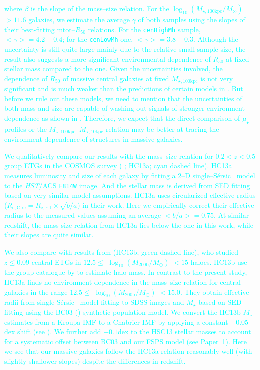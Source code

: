 \documentclass[a4paper,fleqn,usenatbib]{mnras}
\def\ser{{S\'{e}rsic\ }}
\def\rbcg{\texttt{cenHighMh}}
\def\nbcg{\texttt{cenLowMh}}
\def\mstar{{$M_{\star}$}}
\def\logmh{{$\log_{10} (M_{\mathrm{200b}}/M_{\odot})$}}
\def\minn{{$M_{\star,10\mathrm{kpc}}$}}
\def\mtot{{$M_{\star,100\mathrm{kpc}}$}}
\def\logmtot{{$\log_{10} (M_{\star,100\mathrm{kpc}}/M_{\odot})$}}
\def\mden{{$\mu_{\star}$}}
\newcommand{\song}[1]{\textcolor{cyan}{#1}}
\begin{document}
    \song{
    where $\beta$ is the slope of the mass--size relation.
    For the \logmtot{}$>11.6$ galaxies, we estimate the average $\gamma$ of both
    samples using the slopes of their best-fitting mtot{}--$R_{\mathrm{50}}$ relations.
    For the \rbcg{} sample, $<\gamma> = 4.2\pm0.4$; for the \nbcg{} one, 
    $<\gamma> = 3.8\pm0.3$. 
    Although the uncertainty is still quite large mainly due to the relative small 
    sample size, the result also suggests a more significant environmental dependence
    of $R_{\mathrm{50}}$ at fixed stellar mass compared to the \citet{HCompany13} 
    one.
    Given the uncertainties involved, the dependence of $R_{\mathrm{50}}$ of 
    massive central galaxies at fixed \mtot{} is not very significant and is much 
    weaker than the predictions of certain models in \citet{Shankar2014}. 
    But before we rule out these models, we need to mention that the uncertainties 
    of both mass and size are capable of washing out signals of stronger 
    environment--dependence as shown in \citet{HCompany13}.
    Therefore, we expect that the direct comparison of \mden{} profiles or the 
    \mtot{}--\minn{} relation may be better at tracing the environment dependence
    of structures in massive galaxies. 
    }
    
    \song{
    We qualitatively compare our results with the mass--size relation for 
    $0.2 < z < 0.5$ group ETGs in the COSMOS survey (
    \citealt{HueartasCompany2013b}; HC13a; cyan dashed line).
    HC13a measures luminosity and size of each galaxy by fitting a 2--D 
    single--\ser{} model to the \textit{HST}/ACS \texttt{F814W} image. 
    And the stellar mass is derived from SED fitting based on very similar 
    model assumptions. 
    HC13a uses circularized effective radius 
    ($R_{\mathrm{e,Circ}} = R_{\mathrm{e,Fit}} \times \sqrt{b/a}$) in their work. 
    Here we empirically correct their effective radius to the measured values 
    assuming an average $<b/a>=0.75$.
    At similar redshift, the mass-size relation from HC13a lies below the 
    one in this work, while their slopes are quite similar.
    }
    
    \song{
    We also compare with results from \citealt{HCompany13} (HC13b; green dashed line), 
    who studied $z\leq 0.09$ central ETGs in $12.5 \le$ \logmh{} $< 15$ haloes. 
    HC13b use the group catalogue by \citet{Yang2007} to estimate halo mass. 
    In contrast to the present study, HC13a finds no environment dependence in the 
    mass--size relation for central galaxies in the range $12.5\le$ \logmh{} $<15.0$. 
    They obtain effective radii from single-\ser{} model fitting to SDSS 
    images and \mstar{} based on SED fitting using the BC03 (\citealt{BC03}) 
    synthetic population model. 
    We convert the HC13b \mstar{} estimates from a Kroupa IMF to a Chabrier 
    IMF by applying a constant $-0.05$ dex shift (see \citealt{Bernardi2016a}). 
    We further add $+0.1$dex to the HSC13 stellar masses to account for a systematic 
    offset between BC03 and our FSPS model (see Paper~1). 
    Here we see that our massive galaxies follow the HC13a relation reasonably well
    (with slightly shallower slopes) despite the differences in redshift. 
    }
    
\end{document}
